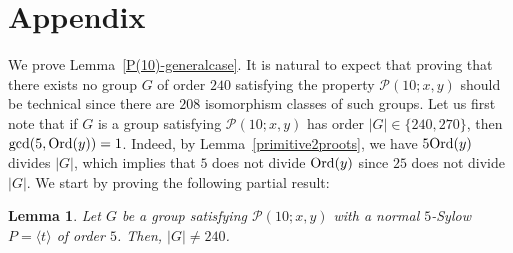 \documentclass[12pt]{amsart}
\numberwithin{equation}{section}
\newcommand{\Ord}{{\rm Ord}}
\newtheorem{lem}[X]{Lemma}
\theoremstyle{definition}
\theoremstyle{remark}
\begin{document}
\section*{Appendix}
We prove Lemma~\ref{P(10)-generalcase}. It is natural to expect that proving that there exists no group $G$ of order $240$ satisfying the property $\mathcal{P}(10;x,y)$ should be technical since there are $208$ isomorphism classes of such groups. Let us first note that if $G$ is a group satisfying $\mathcal{P}(10;x,y)$ has order $|G|\in \{240,270\}$, then $\gcd(5,\Ord(y))=1$. Indeed, by Lemma~\ref{primitive2proots}, we have $5\Ord(y)$ divides $|G|$, which implies that $5$ does not divide $\Ord(y)$ since $25$ does not divide $|G|$. We start by proving the following partial result: 
\begin{lem}\label{P(10)-normalcase}
     Let $G$ be a group satisfying $\mathcal{P}(10;x,y)$ with a normal $5$-Sylow $P=\langle t\rangle$ of order $5$. Then, $|G|\ne 240$.
\end{lem}
\end{document}
